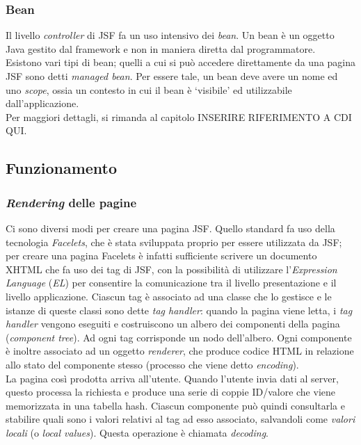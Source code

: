 \subsubsection{Bean}

Il livello \textit{controller} di JSF fa un uso intensivo dei \textsl{bean}. Un bean è un oggetto Java gestito dal framework e non in maniera diretta dal programmatore.\\
Esistono vari tipi di bean; quelli a cui si può accedere direttamente da una pagina JSF sono detti \textit{managed bean}. Per essere tale, un bean deve avere un nome ed uno \textit{scope}, ossia un contesto in cui il bean è \textquoteleft visibile\textquoteright{} ed utilizzabile dall'applicazione. \\
Per maggiori dettagli, si rimanda al capitolo INSERIRE RIFERIMENTO A CDI QUI.


\subsection{Funzionamento}

\subsubsection{\textit{Rendering} delle pagine}
Ci sono diversi modi per creare una pagina JSF. Quello standard fa uso della tecnologia \textsl{Facelets}, che è stata sviluppata proprio per essere utilizzata da JSF; per creare una pagina Facelets è infatti sufficiente scrivere un documento XHTML che fa uso dei tag di JSF, con la possibilità di utilizzare l'\textsl{Expression Language} (\textsl{EL}) per consentire la comunicazione tra il livello presentazione e il livello applicazione. Ciascun tag è associato ad una classe che lo gestisce e le istanze di queste classi sono dette \textit{tag handler}: quando la pagina viene letta, i \textit{tag handler} vengono eseguiti e costruiscono un albero dei componenti della pagina (\textit{component tree}). Ad ogni tag corrisponde un nodo dell'albero. Ogni componente è inoltre associato ad un oggetto \textit{renderer}, che produce codice HTML in relazione allo stato del componente stesso (processo che viene detto \textit{encoding}).\\
La pagina così prodotta arriva all'utente. Quando l'utente invia dati al server, questo processa la richiesta e produce una serie di coppie ID/valore che viene memorizzata in una tabella hash. Ciascun componente può quindi consultarla e stabilire quali sono i valori relativi al tag ad esso associato, salvandoli come \textsl{valori locali} (o \textit{local values}). Questa operazione è chiamata \textit{decoding}.\\

